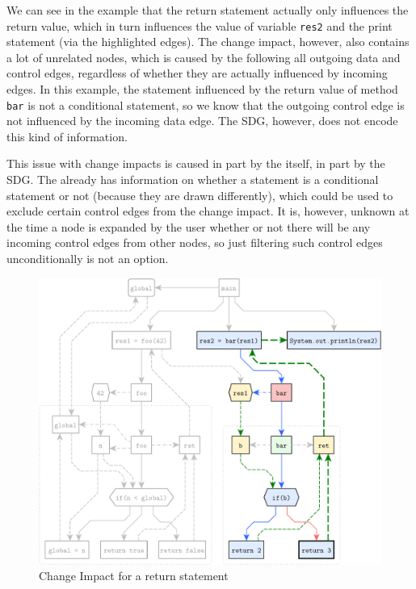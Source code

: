We can see in the example that the return statement actually only influences the return value, which in turn influences 
the value of variable \lstinline|res2| and the print statement (via the highlighted edges). The change impact, however, 
also contains a lot of unrelated nodes, which is caused by the \SB following all outgoing data and control edges, 
regardless of whether they are actually influenced by incoming edges. In this example, the statement influenced by the 
return value of method \lstinline|bar| is not a conditional statement, so we know that the outgoing control edge is not 
influenced by the incoming data edge. The SDG, however, does not encode this kind of information.

This issue with change impacts is caused in part by the \SB itself, in part by the SDG. The \SB already has information 
on whether a statement is a conditional statement or not (because they are drawn differently), which could be used to 
exclude certain control edges from the change impact. It is, however, unknown at the time a node is expanded by the 
user whether or not there will be any incoming control edges from other nodes, so just filtering such control edges 
unconditionally is not an option.

\begin{figure}[htbp]
  \centering
    \includegraphics[scale=0.6]{sdgs/changeimpact}
  \caption{Change Impact for a return statement}
  \label{fig:sdg-changeimpact}
\end{figure}

